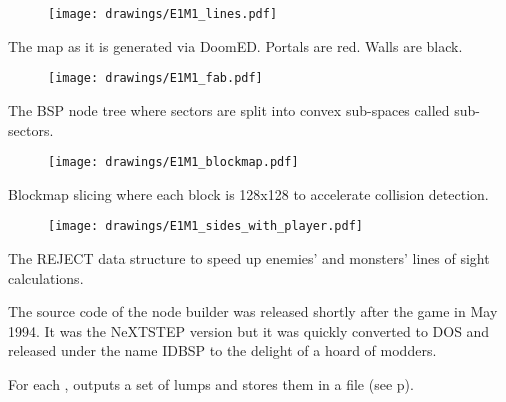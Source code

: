 %
\begin{figure}[H]
\vspace*{3mm}
\centering
\texttt{[image: drawings/E1M1\_lines.pdf]}
\end{figure}
\par
The map as it is generated via DoomED. Portals are red. Walls are black.\\
\par
\begin{figure}[H]
\vspace*{2mm}
\centering
\texttt{[image: drawings/E1M1\_fab.pdf]}
\end{figure}
The BSP node tree where sectors are split into convex sub-spaces called sub-sectors.



\begin{figure}[H]
\centering
\texttt{[image: drawings/E1M1\_blockmap.pdf]}
\end{figure}
\par
Blockmap slicing where each block is 128x128 to accelerate collision detection.\\
\par
\begin{figure}[H]
\centering
\texttt{[image: drawings/E1M1\_sides\_with\_player.pdf]}
\end{figure}
\par
The REJECT data structure to speed up enemies' and monsters' lines of sight calculations.
\pagebreak


The source code of the node builder was released shortly after the game in May 1994. It was the NeXTSTEP version but it was quickly converted to DOS and released under the name IDBSP to the delight of a hoard of modders.\\
\par
{}
\par
For each ,  outputs a set of lumps and stores them in a  file (see p\pageref{wad_explained}).\\

